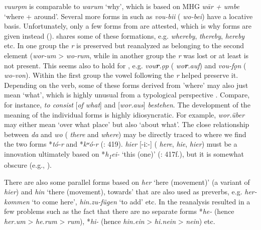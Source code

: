  \textit{vuurǫm} is comparable to  \textit{warum} ‘why’, which is based on MHG \textit{w\=ar + umbe} ‘where + around’. Several more forms in  such as \textit{vou-bii} ( \textit{wo-bei}) have a locative basis. Unfortunately, only a few forms from  are attested, which is why  forms are given instead ().  shares some of these formations, e.g. \textit{whereby}, \textit{thereby}, \textit{hereby} etc. In one group the \textit{r} is preserved but reanalyzed as belonging to the second element (\textit{wor-}\textit{um} > \textit{wo-}\textit{rum}, while in another group the \textit{r} was lost or at least is not present. This seems also to hold for , e.g. \textit{vou}\textbf{\textit{r}}\textit{.ǫp} ( \textit{wo}\textbf{\textit{r}}\textit{.auf}) and \textit{vou-fǫn} ( \textit{wo-von}). Within the first group the vowel following the \textit{r} helped preserve it. Depending on the verb, some of these forms derived from 'where' may also just mean ‘what’, which is highly unusual from a typological perspective \citep{Cysouw2007}. Compare, for instance,  \textit{to consist} [\textit{of what}] and  [\textit{wor.}\textit{aus}] \textit{bestehen}. The development of the meaning of the individual forms is highly idiosyncratic. For example, \textit{wor.über} may either mean ‘over what place’ but also ‘about what’. The close relationship between \textit{da} and \textit{wo} ( \textit{there} and \textit{where}) may be directly traced to  where we find the two forms *\textit{tó-}\textit{r} and *\textit{kʷ}\textit{ó-}\textit{r} (\citealt{MalloryAdams2006}: 419).  \textit{hier} [-iː-] ( \textit{here},  \textit{hie},  \textit{hier}) must be a  innovation ultimately based on *\textit{h\textsubscript{1}}\textit{ei-} ‘this (one)’ (\citealt{MalloryAdams2006}: 417f.), but it is somewhat obscure (e.g., \citealt{Seebold2002}).

There are also some parallel forms based on \textit{her} ‘here (movement)’ (a variant of \textit{hier}) and \textit{hin} ‘there (movement), towards’ that are also used as preverbs, e.g. \textit{her-kommen} ‘to come here’, \textit{hin.zu-fügen} ‘to add’ etc. In  the reanalysis resulted in a few problems such as the fact that there are no separate forms *\textit{he-} (hence \textit{her.um} > \textit{he.rum} > \textit{rum}), *\textit{hi-} (hence \textit{hin.ein} > \textit{hi.nein} > \textit{nein}) etc.

